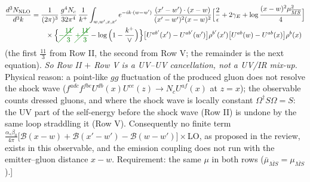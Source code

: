 \documentclass[9pt]{article}
\numberwithin{equation}{section}
\begin{document}
{\color{red}
\begin{align}
\frac{d^{3}N_{\rm NLO}}{d^{3}k}&=\frac{1}{(2\pi)^{3}}\,\frac{g^{4}N_{c}}{32\pi^{4}}\,\frac{1}{k^{+}}\int_{w,w',x,x'}e^{-ik\cdot(w-w')}\,\frac{(x'-w')\cdot(x-w)}{(x'-w')^{2}(x-w)^{2}}\Big[\frac{2}{\epsilon}+2\gamma_{E}+\log\frac{(x-w)^{2}\mu^{2}_{\overline{MS}}}{4}\Big]\notag\\
&\qquad\times\Big\{{\color{green!50!black}\cancel{-\frac{11}{3}}}\ {\color{green!50!black}\cancel{+\frac{11}{3}}}-\log\Big(1-\frac{k^{+}}{\vee}\Big)\Big\}\big[U^{ab'}(x')-U^{ab'}(w')\big]\rho^{b'}(x')\big[U^{ab}(w)-U^{ab}(x)\big]\rho^{b}(x)\notag
\end{align}
{\color{red}(the first $\frac{11}{3}$ from Row II, the second from Row V; the remainder is the next equation). \emph{So Row II $+$ Row V is a UV--UV cancellation, not a UV/IR mix-up.} Physical reason: a point-like $gg$ fluctuation of the produced gluon does not resolve the shock wave ($f^{adc}f^{fbe}U^{db}(x)U^{ce}(z)\to N_{c}U^{af}(x)$ at $z=x$); the observable counts dressed gluons, and where the shock wave is locally constant $\Omega^{\dagger}S\Omega=S$: the UV part of the self-energy before the shock wave (Row II) is undone by the same loop straddling it (Row V). Consequently no finite term $\frac{\alpha_{s}\beta_{0}}{4\pi}\big[\mathcal{B}(x-w)+\mathcal{B}(x'-w')-\mathcal{B}(w-w')\big]\times$LO, as proposed in the review, exists in this observable, and the emission coupling does not run with the emitter--gluon distance $x-w$. Requirement: the same $\mu$ in both rows ($\bar\mu_{\overline{MS}}=\mu_{\overline{MS}}$).]}}\par\noindent
\end{document}
